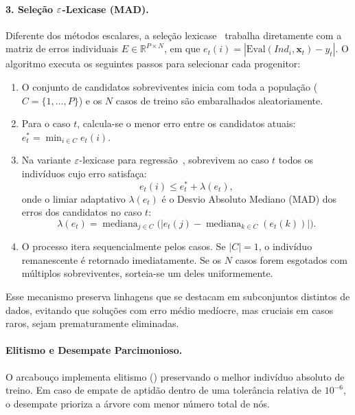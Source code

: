 \paragraph{3. Seleção $\varepsilon$-Lexicase (MAD).}
Diferente dos métodos escalares, a seleção lexicase~\cite{helmuth2015lexicase}
trabalha diretamente com a matriz de erros individuais $E \in \mathbb{R}^{P \times N}$,
em que $e_t(i) = |\mathrm{Eval}(\mathit{Ind}_i, \mathbf{x}_t) - y_t|$. O algoritmo
executa os seguintes passos para selecionar cada progenitor:
\begin{enumerate}
  \item O conjunto de candidatos sobreviventes inicia com toda a população
        ($C = \{1, \dots, P\}$) e os $N$ casos de treino são embaralhados
        aleatoriamente.
  \item Para o caso $t$, calcula-se o menor erro entre os candidatos atuais:
        $e^*_t = \min_{i \in C} e_t(i)$.
  \item Na variante $\varepsilon$-lexicase para regressão~\cite{lacava2016epsilon},
        sobrevivem ao caso $t$ todos os indivíduos cujo erro satisfaça:
        \begin{equation}
          e_t(i) \le e^*_t + \lambda(e_t),
          \label{eq:eps_lexicase}
        \end{equation}
        onde o limiar adaptativo $\lambda(e_t)$ é o Desvio Absoluto Mediano
        (MAD) dos erros dos candidatos no caso $t$:
        \begin{equation}
          \lambda(e_t) = \operatorname{mediana}_{j \in C}\Big(\big|e_t(j) - \operatorname{mediana}_{k \in C}(e_t(k))\big|\Big).
        \end{equation}
  \item O processo itera sequencialmente pelos casos. Se $|C| = 1$, o indivíduo
        remanescente é retornado imediatamente. Se os $N$ casos forem
        esgotados com múltiplos sobreviventes, sorteia-se um deles
        uniformemente.
\end{enumerate}
Esse mecanismo preserva linhagens que se destacam em subconjuntos distintos
de dados, evitando que soluções com erro médio medíocre, mas cruciais em
casos raros, sejam prematuramente eliminadas.

\paragraph{Elitismo e Desempate Parcimonioso.}
O arcabouço implementa elitismo () preservando o melhor
indivíduo absoluto de treino. Em caso de empate de aptidão dentro de uma
tolerância relativa de $10^{-6}$, o desempate prioriza a árvore com menor
número total de nós.

